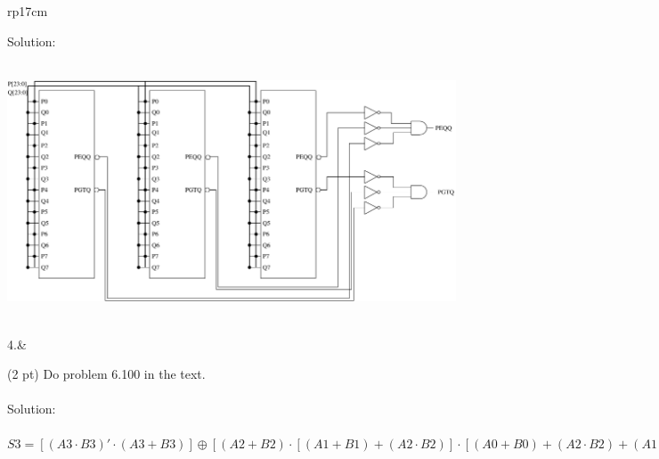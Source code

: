 \documentclass{article}
\begin{document}
\begin{longtable}[l]{rp{17cm}}
\begin{minipage}[t]{\linewidth}
Solution: \\ \\
\begin{center}
  \includegraphics[scale=0.8]{../XOR/Assessments/Wakerly_6_96}
\end{center}
\end{minipage}\\
\medskip
4.&\begin{minipage}[t]{\linewidth}(2 pt) Do problem 6.100 in the text.\\ \\

Solution: \\ \\
$S3 = [(A3 \cdot B3)' \cdot (A3 + B3)] \oplus [(A2 + B2) \cdot [(A1 + B1) + (A2 \cdot B2)] \cdot [(A0 + B0) + (A2 \cdot B2) + (A1 + B1)] \cdot [(A2 \cdot B2) + (A1 \cdot B1) + (A0 + B0) + C0]]$
\end{minipage}\\
\medskip
\end{longtable}
\end{document}
